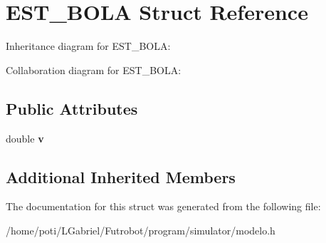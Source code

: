 \hypertarget{structEST__BOLA}{}\section{E\+S\+T\+\_\+\+B\+O\+LA Struct Reference}
\label{structEST__BOLA}


Inheritance diagram for E\+S\+T\+\_\+\+B\+O\+LA\+:


Collaboration diagram for E\+S\+T\+\_\+\+B\+O\+LA\+:
\subsection*{Public Attributes}
\begin{DoxyCompactItemize}
\item 
double {\bfseries v}\hypertarget{structEST__BOLA_a7eb7d14dda6b7bf90b5039f6083d5262}{}\label{structEST__BOLA_a7eb7d14dda6b7bf90b5039f6083d5262}

\end{DoxyCompactItemize}
\subsection*{Additional Inherited Members}


The documentation for this struct was generated from the following file\+:\begin{DoxyCompactItemize}
\item 
/home/poti/\+L\+Gabriel/\+Futrobot/program/simulator/modelo.\+h\end{DoxyCompactItemize}
